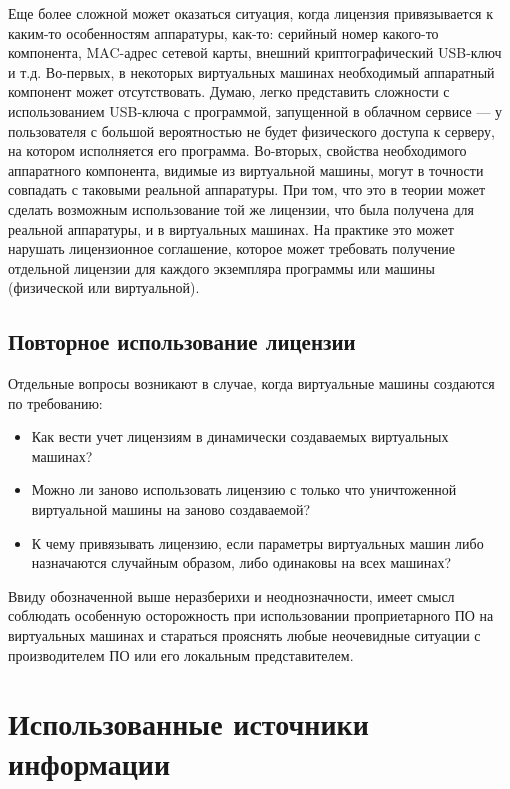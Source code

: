 \documentclass[14pt, a4paper]{article}
\begin{document}
Еще более сложной может оказаться ситуация, когда лицензия привязывается к
каким-то особенностям аппаратуры, как-то: серийный номер какого-то компонента,
MAC-адрес сетевой карты, внешний криптографический USB-ключ и т.д. Во-первых, в
некоторых виртуальных машинах необходимый аппаратный компонент может
отсутствовать. Думаю, легко представить сложности с использованием USB-ключа с
программой, запущенной в облачном сервисе — у пользователя с большой
вероятностью не будет физического доступа к серверу, на котором исполняется его
программа. Во-вторых, свойства необходимого аппаратного компонента, видимые из
виртуальной машины, могут в точности совпадать с таковыми реальной аппаратуры.
При том, что это в теории может сделать возможным использование той же лицензии,
что была получена для реальной аппаратуры, и в виртуальных машинах. На практике
это может нарушать лицензионное соглашение, которое может требовать получение
отдельной лицензии для каждого экземпляра программы или машины (физической или
виртуальной).\\

\subsection*{Повторное использование лицензии}

Отдельные вопросы возникают в случае, когда виртуальные машины создаются по
требованию:
\begin{itemize}
    \item Как вести учет лицензиям в динамически создаваемых виртуальных машинах?
    \item Можно ли заново использовать лицензию с только что уничтоженной
    виртуальной машины на заново создаваемой?
    \item К чему привязывать лицензию, если параметры виртуальных машин либо
    назначаются случайным образом, либо одинаковы на всех машинах?
\end{itemize}

Ввиду обозначенной выше неразберихи и неоднозначности, имеет смысл соблюдать
особенную осторожность при использовании проприетарного ПО на виртуальных
машинах и стараться прояснять любые неочевидные ситуации с производителем ПО
или его локальным представителем.

\section*{Использованные источники информации}
\end{document}
